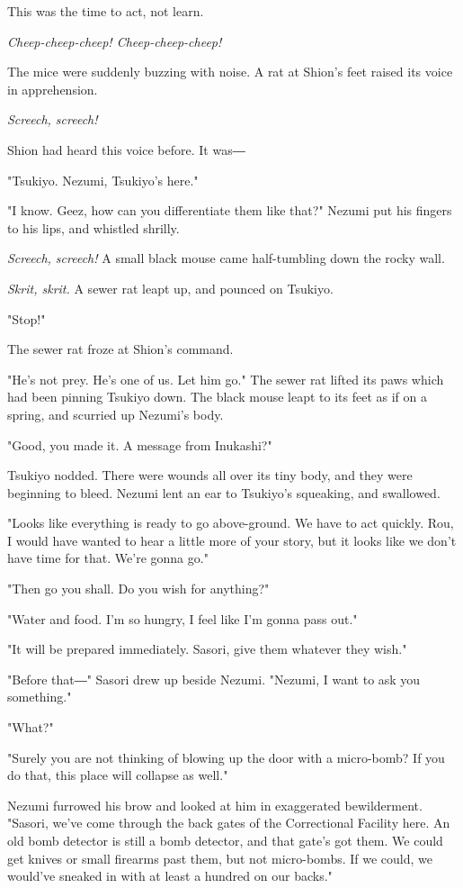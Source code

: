 This was the time to act, not learn.

\emph{Cheep-cheep-cheep! Cheep-cheep-cheep!}

The mice were suddenly buzzing with noise. A rat at Shion's feet raised
its voice in apprehension.

\emph{Screech, screech!}

Shion had heard this voice before. It was―

"Tsukiyo. Nezumi, Tsukiyo's here."

"I know. Geez, how can you differentiate them like that?" Nezumi put his
fingers to his lips, and whistled shrilly.

\emph{Screech, screech!} A small black mouse came half-tumbling down the rocky
wall.

\emph{Skrit, skrit.} A sewer rat leapt up, and pounced on Tsukiyo.

"Stop!"

The sewer rat froze at Shion's command.

"He's not prey. He's one of us. Let him go." The sewer rat lifted its
paws which had been pinning Tsukiyo down. The black mouse leapt to its
feet as if on a spring, and scurried up Nezumi's body.

"Good, you made it. A message from Inukashi?"

Tsukiyo nodded. There were wounds all over its tiny body, and they were
beginning to bleed. Nezumi lent an ear to Tsukiyo's squeaking, and
swallowed.

"Looks like everything is ready to go above-ground. We have to act
quickly. Rou, I would have wanted to hear a little more of your story,
but it looks like we don't have time for that. We're gonna go."

"Then go you shall. Do you wish for anything?"

"Water and food. I'm so hungry, I feel like I'm gonna pass out."

"It will be prepared immediately. Sasori, give them whatever they wish."

"Before that―" Sasori drew up beside Nezumi. "Nezumi, I want to ask you
something."

"What?"

"Surely you are not thinking of blowing up the door with a micro-bomb?
If you do that, this place will collapse as well."

Nezumi furrowed his brow and looked at him in exaggerated bewilderment.
"Sasori, we've come through the back gates of the Correctional Facility
here. An old bomb detector is still a bomb detector, and that gate's got
them. We could get knives or small firearms past them, but not
micro-bombs. If we could, we would've sneaked in with at least a hundred
on our backs."

